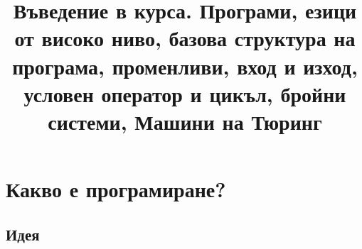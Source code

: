 \documentclass{beamer}
\begin{document}
\title[Увод в курса]{Въведение в курса. Програми, езици от високо ниво, базова структура на програма, променливи, вход и изход, условен оператор и цикъл, бройни системи, Машини на Тюринг} 
\frame{\titlepage} 

\section{Какво е програмиране?} 
\subsection{Идея}



\end{document}
